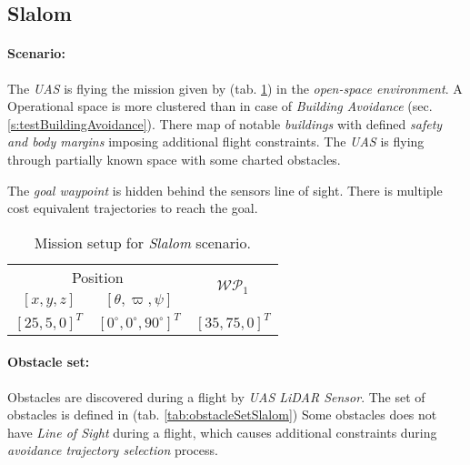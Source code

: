\subsection{Slalom}\label{s:testSlalom}

\paragraph{Scenario:} The \emph{UAS} is flying the mission given by (tab. \ref{tab:missionSetupSlalomScenario}) in the \emph{open-space environment}. A Operational space is more clustered than in case of \emph{Building Avoidance} (sec. \ref{s:testBuildingAvoidance}). There map of notable \emph{buildings} with defined \emph{safety and body margins} imposing additional flight constraints. The \emph{UAS} is flying through partially known space with some charted obstacles. 

The \emph{goal waypoint} is hidden behind the sensors line of sight. There is multiple cost equivalent trajectories to reach the goal. 

\begin{table}[H]
    \centering
    \begin{tabular}{c|c||c}
        \multicolumn{2}{c||}{Position} & \multirow{2}{*}{$\mathscr{WP}_1$} \\\cline{1-2}
        $[x,y,z]$           & $[\theta,\varpi,\psi]$           & \\\hline\hline
        $[25,5,0]^T $        & $[0^\circ,0^\circ,90^\circ]^T$    & $[35,75,0]^T$        \\ 
    \end{tabular}
    \caption{Mission setup for \emph{Slalom} scenario.}
    \label{tab:missionSetupSlalomScenario}
\end{table}

\paragraph{Obstacle set:} Obstacles are discovered during a flight by \emph{UAS LiDAR Sensor}. The set of obstacles is defined in (tab. \ref{tab:obstacleSetSlalom}) Some obstacles does not have \emph{Line of Sight} during a flight, which causes additional constraints during \emph{avoidance trajectory selection} process.


